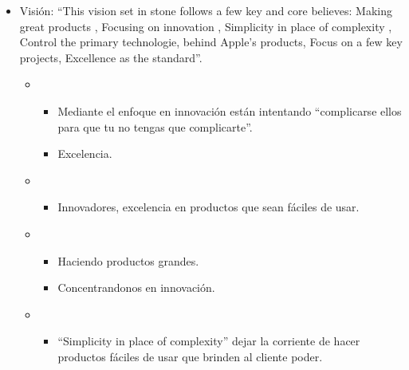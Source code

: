 \documentclass{article}
\begin{document}
\begin{itemize}
    \item Visión: ``This vision set in stone follows a few key and core believes: Making great products , Focusing on innovation , Simplicity in place of complexity , Control the primary technologie, behind Apple's products, Focus on a few key projects, Excellence as the standard''.
        \begin{itemize}
            \item {} 
                \begin{itemize}
                    \item Mediante el enfoque en innovación están intentando ``complicarse ellos para que tu no tengas que complicarte''.
                    \item Excelencia.
                \end{itemize}
                
            \item {} 
                \begin{itemize}
                    \item Innovadores, excelencia en productos que sean fáciles de usar.
                \end{itemize}
                
            \item {} 
                \begin{itemize}
                    \item Haciendo productos grandes.
                    \item Concentrandonos en innovación.
                \end{itemize}
                
            \item {} 
                \begin{itemize}
                    \item ``Simplicity in place of complexity'' dejar la corriente de hacer productos fáciles de usar que brinden al cliente poder.
                \end{itemize}
                
        \end{itemize}
\end{itemize}



\end{document}
